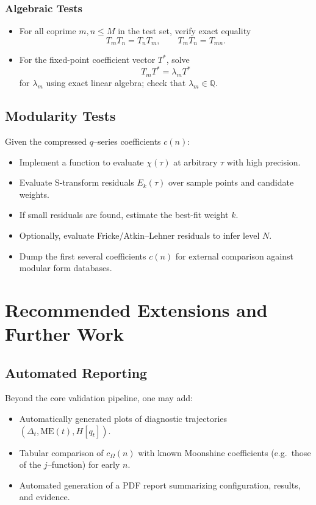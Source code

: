 \documentclass[11pt]{article}
\theoremstyle{definition}
\theoremstyle{plain}
\theoremstyle{remark}
\newcommand{\Qbb}{\mathbb{Q}}
\begin{document}
\subsubsection*{Algebraic Tests}

\begin{itemize}[leftmargin=1.5em]
  \item For all coprime $m,n \le M$ in the test set, verify exact equality
  \[
    T_m T_n = T_n T_m,\qquad T_m T_n = T_{mn}.
  \]
  \item For the fixed-point coefficient vector $T^*$, solve
  \[
    T_m T^* = \lambda_m T^*
  \]
  for $\lambda_m$ using exact linear algebra; check that $\lambda_m \in \Qbb$.
\end{itemize}

\subsection{Modularity Tests}

Given the compressed $q$--series coefficients $c(n)$:

\begin{itemize}[leftmargin=1.5em]
  \item Implement a function to evaluate $\chi(\tau)$ at arbitrary $\tau$ with high precision.
  \item Evaluate S-transform residuals $E_k(\tau)$ over sample points and candidate weights.
  \item If small residuals are found, estimate the best-fit weight $k$.
  \item Optionally, evaluate Fricke/Atkin--Lehner residuals to infer level $N$.
  \item Dump the first several coefficients $c(n)$ for external comparison against modular form databases.
\end{itemize}

\section{Recommended Extensions and Further Work}

\subsection{Automated Reporting}

Beyond the core validation pipeline, one may add:
\begin{itemize}[leftmargin=1.5em]
  \item Automatically generated plots of diagnostic trajectories $(\Delta_t, \mathrm{ME}(t), H[q_t])$.
  \item Tabular comparison of $c_\Omega(n)$ with known Moonshine coefficients (e.g.\ those of the $j$–function) for early $n$.
  \item Automated generation of a PDF report summarizing configuration, results, and evidence.
\end{itemize}
\end{document}
